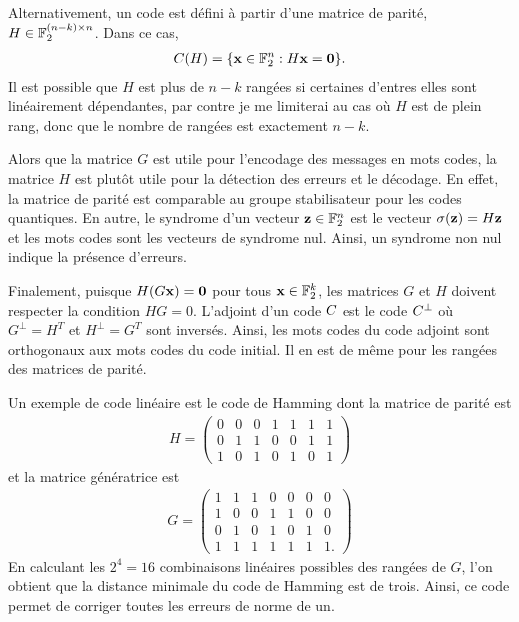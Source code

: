 Alternativement,
un code est défini à partir d'une matrice de parité, $H \in \mathbb{F}_{2}^{(n - k) \times n}$.
Dans ce cas,
\begin{align}
	C(H) = \qty{
		\vb x \in \mathbb{F}_{2}^n : H \vb x = \vb 0
	}.
\end{align}
Il est possible que $H$ est plus de $n - k$ rangées si certaines d'entres elles 
sont linéairement dépendantes, par contre je me limiterai au cas où $H$ est 
de plein rang, donc que le nombre de rangées est exactement $n - k$.

Alors que la matrice $G$ est utile pour l'encodage des messages en mots codes,
la matrice $H$ est plutôt utile pour la détection des erreurs et le décodage.
En effet,
la matrice de parité est comparable au groupe stabilisateur pour les codes quantiques.
En autre,
le syndrome d'un vecteur $\vb z \in \mathbb{F}_{2}^n$ est le vecteur $\sigma(\vb z) = H\vb z$
et les mots codes sont les vecteurs de syndrome nul.
Ainsi, un syndrome non nul indique la présence d'erreurs.

Finalement, puisque $H (G\vb x) = \vb 0$ pour tous $\vb x \in \mathbb{F}_{2}^k$,
les matrices $G$ et $H$ doivent respecter la condition $HG = 0$.
L'adjoint d'un code $C$ est le code $C^\perp$ où $G^\perp = H^T$ et $H^\perp = G^T$ sont inversés.
Ainsi, les mots codes du code adjoint sont orthogonaux aux mots codes du code initial.
Il en est de même pour les rangées des matrices de parité.

Un exemple de code linéaire est le code de Hamming dont la matrice
de parité est 
\begin{align}
	H = \begin{pmatrix}
		0 & 0 & 0 & 1 & 1 & 1 & 1 \\
		0 & 1 & 1 & 0 & 0 & 1 & 1 \\
		1 & 0 & 1 & 0 & 1 & 0 & 1
	\end{pmatrix}
\end{align}
et la matrice génératrice est 
\begin{align}
	G = \begin{pmatrix}
		1 & 1 & 1 & 0 & 0 & 0 & 0 \\
		1 & 0 & 0 & 1 & 1 & 0 & 0 \\
		0 & 1 & 0 & 1 & 0 & 1 & 0 \\
		1 & 1 & 1 & 1 & 1 & 1 & 1.
	\end{pmatrix}
\end{align}
En calculant les $2^4 = 16$ combinaisons linéaires possibles des 
rangées de $G$,
l'on obtient que la distance minimale du code de Hamming est de trois.
Ainsi,
ce code permet de corriger toutes les erreurs de norme de un.

